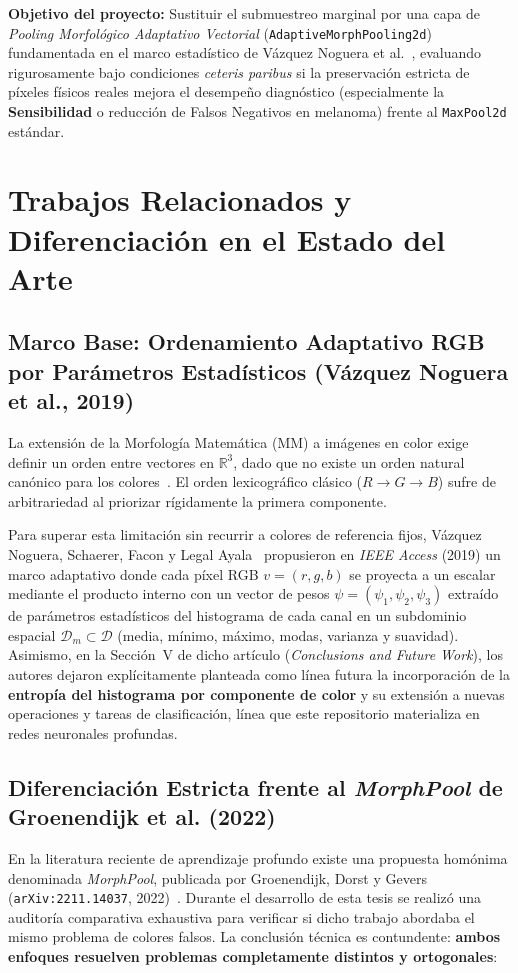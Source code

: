 \documentclass[10pt,a4paper,twocolumn]{article}
\begin{document}
\textbf{Objetivo del proyecto:} Sustituir el submuestreo marginal por una capa de \emph{Pooling Morfológico Adaptativo Vectorial} (\texttt{AdaptiveMorphPooling2d}) fundamentada en el marco estadístico de Vázquez Noguera et al.~\cite{vazquez2019adaptive}, evaluando rigurosamente bajo condiciones \emph{ceteris paribus} si la preservación estricta de píxeles físicos reales mejora el desempeño diagnóstico (especialmente la \textbf{Sensibilidad} o reducción de Falsos Negativos en melanoma) frente al \texttt{MaxPool2d} estándar.

\section{Trabajos Relacionados y Diferenciación en el Estado del Arte}

\subsection{Marco Base: Ordenamiento Adaptativo RGB por Parámetros Estadísticos (Vázquez Noguera et al., 2019)}
La extensión de la Morfología Matemática (MM) a imágenes en color exige definir un orden entre vectores en $\mathbb{R}^3$, dado que no existe un orden natural canónico para los colores~\cite{aptoula2007comparative}. El orden lexicográfico clásico ($R \to G \to B$) sufre de arbitrariedad al priorizar rígidamente la primera componente.

Para superar esta limitación sin recurrir a colores de referencia fijos, Vázquez Noguera, Schaerer, Facon y Legal Ayala~\cite{vazquez2019adaptive} propusieron en \emph{IEEE Access} (2019) un marco adaptativo donde cada píxel RGB $v = (r,g,b)$ se proyecta a un escalar mediante el producto interno con un vector de pesos $\psi = (\psi_1, \psi_2, \psi_3)$ extraído de parámetros estadísticos del histograma de cada canal en un subdominio espacial $\mathcal{D}_m \subset \mathcal{D}$ (media, mínimo, máximo, modas, varianza y suavidad). Asimismo, en la Sección~V de dicho artículo (\emph{Conclusions and Future Work}), los autores dejaron explícitamente planteada como línea futura la incorporación de la \textbf{entropía del histograma por componente de color} y su extensión a nuevas operaciones y tareas de clasificación, línea que este repositorio materializa en redes neuronales profundas.

\subsection{Diferenciación Estricta frente al \emph{MorphPool} de Groenendijk et al. (2022)}
En la literatura reciente de aprendizaje profundo existe una propuesta homónima denominada \emph{MorphPool}, publicada por Groenendijk, Dorst y Gevers (\texttt{arXiv:2211.14037}, 2022)~\cite{groenendijk2022morphpool}. Durante el desarrollo de esta tesis se realizó una auditoría comparativa exhaustiva para verificar si dicho trabajo abordaba el mismo problema de colores falsos. La conclusión técnica es contundente: \textbf{ambos enfoques resuelven problemas completamente distintos y ortogonales}:
\end{document}
